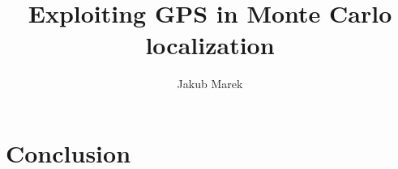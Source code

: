 \documentclass[11pt,a4paper,pdftex,twoside]{memoir}
\title{Exploiting GPS in Monte Carlo localization}
\author{Jakub Marek}
\begin{document}












\chapter{Conclusion}


\end{document}
